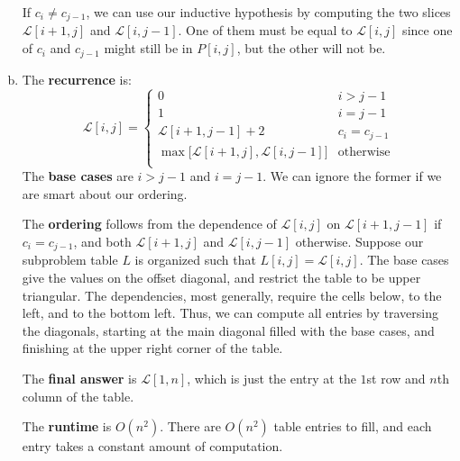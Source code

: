\documentclass[10pt]{article}
\newcommand{\Ell}{\mathcal{L}}
\begin{document}
\begin{solution}
\begin{enumerate}[(a)]
{        If $c_i \neq c_{j-1}$, we can use our inductive hypothesis by computing 
        the two slices $\Ell[i+1, j]$ and $\Ell[i, j-1]$. 
        One of them must be equal to $\Ell[i, j]$ since one of $c_i$ and 
        $c_{j-1}$  might still be in $P[i, j]$, but the other will not be. 
    }
    \item {
        The \textbf{recurrence} is:
        $$
        \Ell[i, j] = 
        \begin{cases}
            0 & i > j-1 \\
            1 & i = j-1 \\
            \Ell[i+1, j-1] + 2 & c_i = c_{j-1} \\
            \max \Bigr [\Ell[i+1, j], \Ell[i, j-1] \Bigr ] & \text{otherwise} \\
        \end{cases}
        $$
        The \textbf{base cases} are $i > j-1$ and $i = j-1$. 
        We can ignore the former if we are smart about our ordering. 

        The \textbf{ordering} follows from the dependence of $\Ell[i, j]$ on 
        $\Ell[i+1, j-1]$ if $c_i = c_{j-1}$, and both $\Ell[i+1, j]$ and 
        $\Ell[i, j-1]$ otherwise. 
        Suppose our subproblem table $L$ is organized such that 
        $L[i, j] = \Ell[i, j]$. 
        The base cases give the values on the offset diagonal, and restrict the 
        table to be upper triangular. 
        The dependencies, most generally, require the cells below, to the left, 
        and to the bottom left. 
        Thus, we can compute all entries by traversing the diagonals, starting 
        at the main diagonal filled with the base cases, and finishing at the 
        upper right corner of the table. 

        The \textbf{final answer} is $\Ell[1, n]$, which is just the entry at the $1$st 
        row and $n$th column of the table. 

        The \textbf{runtime} is $O(n^2)$. There are $O(n^2)$ table entries to 
        fill, and each entry takes a constant amount of computation. 

    }
\end{enumerate}

\end{solution}

\newpage
\end{document}
